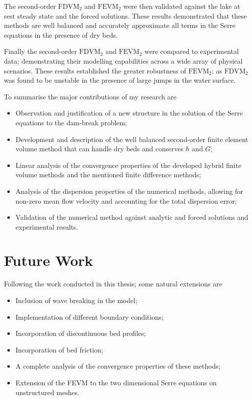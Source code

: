 The second-order $\text{FDVM}_2$ and $\text{FEVM}_2$ were then validated against the lake at rest steady state and the forced solutions. These results demonstrated that these methods are well balanced and accurately approximate all terms in the Serre equations in the presence of dry beds. 

Finally the second-order $\text{FDVM}_2$ and $\text{FEVM}_2$ were compared to experimental data; demonstrating their modelling capabilities across a wide array of physical scenarios. These results established the greater robustness of $\text{FEVM}_2$; as $\text{FDVM}_2$ was found to be unstable in the presence of large jumps in the water surface. 

To summarise the major contributions of my research are
\begin{itemize}
	\item Observation and justification of a new structure in the solution of the Serre equations to the dam-break problem;
	\item Development and description of the well balanced second-order finite element volume method that can handle dry beds and conserves $h$ and $G$;
	\item Linear analysis of the convergence properties of the developed hybrid finite volume methods and the mentioned finite difference methods;
	\item Analysis of the dispersion properties of the numerical methods, allowing for non-zero mean flow velocity and accounting for the total dispersion error;
	\item Validation of the numerical method against analytic and forced solutions and experimental results. 
\end{itemize}

\section{Future Work}
Following the work conducted in this thesis; some natural extensions are
\begin{itemize}
	\item Inclusion of wave breaking in the model; 
	\item Implementation of different boundary conditions;
	\item Incorporation of discontinuous bed profiles;
	\item Incorporation of bed friction;
	\item A complete analysis of the convergence properties of these methods;
	\item Extension of the FEVM to the two dimensional Serre equations on unstructured meshes.
\end{itemize}




